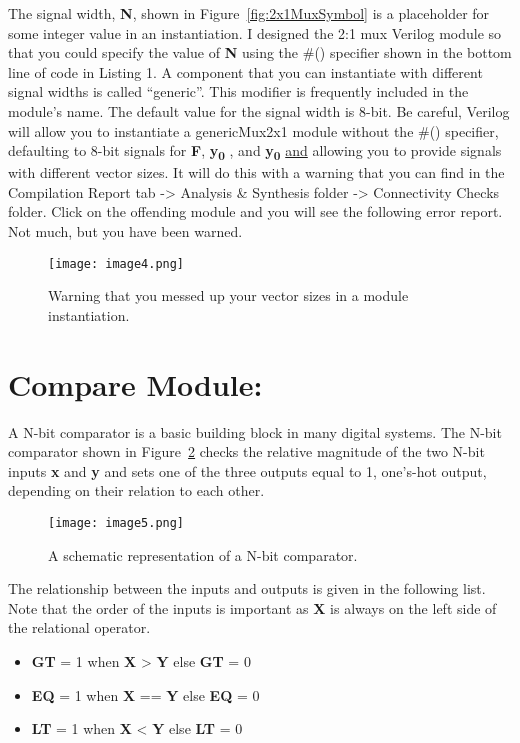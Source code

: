The signal width, \textbf{N}, shown in Figure~\ref{fig:2x1MuxSymbol} is a placeholder for
some integer value in an instantiation. I designed the 2:1 mux Verilog
module so that you could specify the value of \textbf{N} using the \#()
specifier shown in the bottom line of code in Listing 1. A component
that you can instantiate with different signal widths is called
``generic''. This modifier is frequently included in the module's name.
The default value for the signal width is 8-bit. Be careful, Verilog
will allow you to instantiate a genericMux2x1 module without the \#()
specifier, defaulting to 8-bit signals for \textbf{F},
\textbf{y\textsubscript{0}} , and \textbf{y\textsubscript{0}}
\uline{and} allowing you to provide signals with different vector sizes.
It will do this with a warning that you can find in the Compilation
Report tab -\textgreater{} Analysis \& Synthesis folder -\textgreater{}
Connectivity Checks folder. Click on the offending module and you will
see the following error report. Not much, but you have been warned.

\begin{figure}[ht]
\texttt{[image: image4.png]}
\caption{Warning that you messed up your vector sizes in a module instantiation.}
\label{fig:vectorSizeWarnings}
\end{figure}

\hypertarget{compare-module}{%
\section{Compare Module:}\label{compare-module}}

A N-bit comparator is a basic building block in many digital systems.
The N-bit comparator shown in Figure~\ref{fig:comparatorSymbol} 
checks the relative magnitude of
the two N-bit inputs \textbf{x} and \textbf{y} and sets one of the three
outputs equal to 1, one's-hot output, depending on their relation to
each other.

\begin{figure}[ht]
\texttt{[image: image5.png]}
\caption{A schematic representation of a N-bit comparator.}
\label{fig:comparatorSymbol}
\end{figure}

The relationship between the inputs and outputs is given in the
following list. Note that the order of the inputs is important as
\textbf{X} is always on the left side of the relational operator.

\begin{itemize}
\item    \textbf{GT} = 1 when \textbf{X} \textgreater{} \textbf{Y} else  \textbf{GT} = 0
\item    \textbf{EQ} = 1 when \textbf{X} == \textbf{Y} else \textbf{EQ} = 0
\item    \textbf{LT} = 1 when \textbf{X} \textless{} \textbf{Y} else   \textbf{LT} = 0
\end{itemize}

